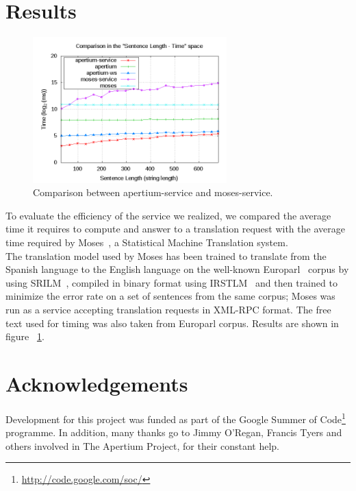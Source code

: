\documentclass[11pt]{article}
\begin{document}
\section{Results}

\begin{figure}[!ht]
\begin{center}
\includegraphics[width=7.5cm]{comp}
\end{center}
\caption{Comparison between apertium-service and moses-service.}
\label{fig:comp}
\end{figure}

To evaluate the efficiency of the service we realized, we compared the average time it requires to compute and answer to a translation request with the average time required 
by Moses~\citep{moses}, a Statistical Machine Translation system.\\

The translation model used by Moses has been trained to translate from the Spanish language to the English language on the well-known Europarl~\citep{europarl} corpus 
by using SRILM~\citep{srilm}, compiled in binary format using IRSTLM~\citep{irstlm} and then trained to minimize the error rate on a set of sentences from the same corpus; 
Moses was run as a service accepting translation requests in XML-RPC format. The free text used for timing was also taken from Europarl corpus.
Results are shown in figure ~\ref{fig:comp}.

\section*{Acknowledgements}

Development for this project was funded as part of the Google Summer of Code\footnote{\url{http://code.google.com/soc/}} programme. 
In addition, many thanks go to Jimmy O'Regan, Francis Tyers and others involved in The Apertium Project, for their constant help.




\end{document}
